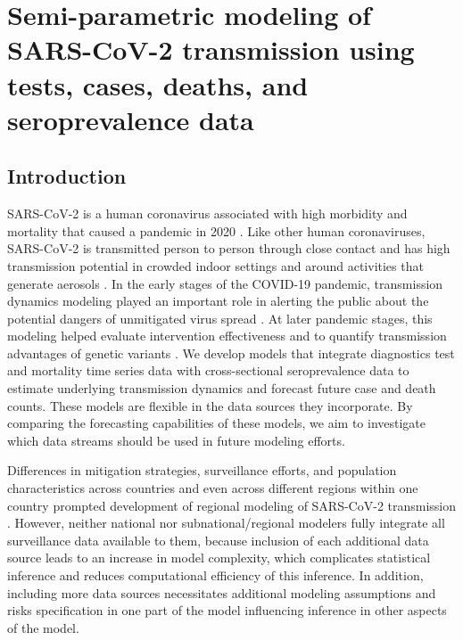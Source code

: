 \chapter{Semi-parametric modeling of SARS-CoV-2 transmission using tests, cases, deaths, and seroprevalence data}
\label{ch:content_2}
\graphicspath{{figures/ch_4/}}

\section{Introduction}
SARS-CoV-2 is a human coronavirus associated with high morbidity and mortality that caused a pandemic in 2020 \citep{Wu2020CDC, Song2020}.
Like other human coronaviruses, SARS-CoV-2 is transmitted person to person through close contact and has high transmission potential in crowded indoor settings and around activities that generate aerosols \citep{whocoronavirustrans}.
In the early stages of the COVID-19 pandemic, transmission dynamics modeling played an important role in alerting the public about the potential dangers of unmitigated virus spread \citep{prem2020effect, ferguson2020report9, davies2020}.
At later pandemic stages, this modeling helped evaluate intervention effectiveness \citep{Knockeabg2021} and to quantify transmission advantages of genetic variants \citep{Davieseabg2021}.
We develop models that integrate diagnostics test and mortality time series data with cross-sectional seroprevalence data to estimate underlying transmission dynamics and forecast future case and death counts.
These models are flexible in the data sources they incorporate.
By comparing the forecasting capabilities of these models, we aim to investigate which data streams should be used in future modeling efforts.
\par
Differences in mitigation strategies, surveillance efforts, and population characteristics across countries and even across different regions within one country prompted development of regional modeling of SARS-CoV-2 transmission \citep{anderson2020, miller2020, morozova2021one, irons2021estimating}.
However, neither national nor subnational/regional modelers fully integrate all surveillance data available to them, because inclusion of each additional data source leads to an increase in model complexity, which complicates statistical inference and reduces computational efficiency of this inference.
In addition, including more data sources necessitates additional modeling assumptions and risks specification in one part of the model influencing inference in other aspects of the model.
